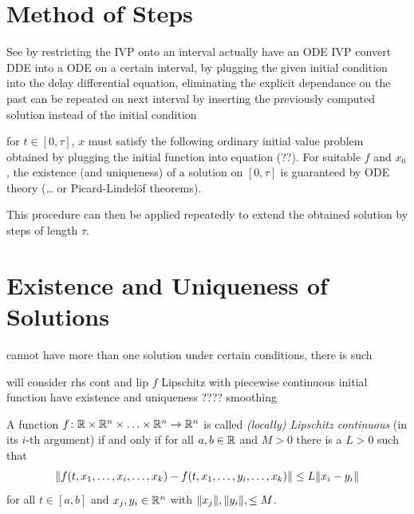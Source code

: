 \section{Method of Steps}
    \label{sec:method-of-steps}
    
    See \cite{Falbo06FDEs}
    by restricting the IVP onto an interval
    actually have an ODE IVP
    convert DDE into a ODE on a certain interval, by plugging the given initial condition into the delay differential equation, eliminating the explicit dependance on the past
    can be repeated on next interval by inserting the previously computed solution instead of the initial condition

    for $t\in [0,\tau]$, $x$ must satisfy the following ordinary initial value problem obtained by plugging the initial function into equation (??). For suitable $f$ and $x_0$, the existence (and uniqueness) of a solution on $[0,\tau]$ is guaranteed by ODE theory (\ldots{} or Picard-Lindelöf theorems).

    This procedure can then be applied repeatedly to extend the obtained solution by steps of length $\tau$.





\section{Existence and Uniqueness of Solutions}
    \label{solutions-existence-uniqueness}

    cannot have more than one solution
    under certain conditions, there is such 

    will consider rhs cont and lip
    $f$ Lipschitz with piecewise continuous initial function have existence and uniqueness ???? smoothing

    \begin{definition}\label{def:lipschitz}
        A function $f\colon\mathbb{R}\times\mathbb{R}^n\times\ldots\times\mathbb{R}^n\to\mathbb{R}^n$ is called \emph{(locally) Lipschitz continuous} (in its $i$-th argument) if and only if for all $a,b\in\mathbb{R}$ and $M>0$ there is a $L>0$ such that
        \begin{equation*}
            \nnorm*{f(t,x_1,\ldots,x_i,\ldots,x_k) - f(t,x_1,\ldots,y_i,\ldots,x_k)} \leq L\nnorm*{x_i - y_i}
        \end{equation*}
        for all $t\in [a,b]$ and $x_j,y_i\in\mathbb{R}^n$ with $\lVert x_j\rVert,\lVert y_i\rVert,\leq M$.
    \end{definition}

